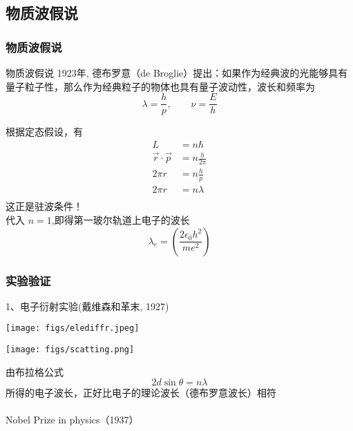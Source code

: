 \subsection{物质波假说}

\begin{frame}   
  \frametitle{物质波假说}
  \begin{atcbox}{物质波假说}
  1923年, 德布罗意（de Broglie）提出：如果作为经典波的光能够具有量子粒子性，那么作为经典粒子的物体也具有量子波动性，波长和频率为
  \[\lambda=\frac{h}{p}, \qquad \nu =\frac{E}{h}\]
  \end{atcbox}
\end{frame}

\begin{frame}  
    \frame{}
    \解 根据定态假设，有
    \begin{equation*}
        \begin{split}
            L&=n\hbar \\
            \vec{r} \cdot \vec{p} & =  n\frac{h}{2 \pi} \\
            2\pi r&=  n\frac{h}{p}\\
            2\pi r&=  n\lambda  \\
        \end{split} 
     \end{equation*}
     这正是驻波条件！ \\
     代入 $n=1$,即得第一玻尔轨道上电子的波长
     \[\lambda _e = (\frac{2\epsilon_0 h^2}{m e^2})\]
\end{frame}


\begin{frame}   
  \frametitle{实验验证}
  1、电子衍射实验(戴维森和革末, 1927)
  \begin{center}
    \texttt{[image: figs/elediffr.jpeg]} \\
    \end{center} 
\end{frame}
\begin{frame}   
    \begin{center}
      \texttt{[image: figs/scatting.png]} \\
    \end{center} 
       由布拉格公式 $$2d\sin \theta=n\lambda $$
       所得的电子波长，正好比电子的理论波长（德布罗意波长）相符\\
       ~~\\ 
  {\color{deepblue} Nobel Prize in physics（1937）}  
  \end{frame}


